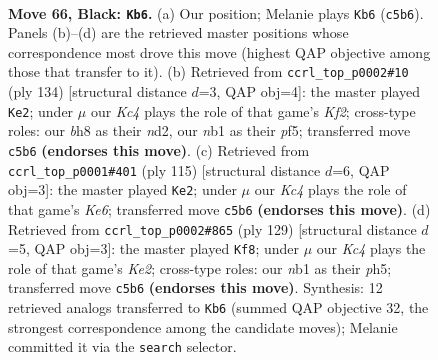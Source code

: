 \documentclass[11pt]{article}
\begin{document}
\clearpage

\begin{figure}[p]\centering
\begin{subfigure}{0.46\textwidth}\centering
\resizebox{\linewidth}{!}{%
\newchessgame
\chessboard[
  setfen={7B/8/8/p1k5/2p3b1/8/5K2/1N6 b - - 1 66},
  showmover=false,
  pgfstyle=straightmove, color=movearrow, markmove={c5-b6}
]}
\caption{}
\end{subfigure}\hfill
\begin{subfigure}{0.46\textwidth}\centering
\resizebox{\linewidth}{!}{%
\newchessgame
\chessboard[
  setfen={3B4/8/8/5p1k/8/4P3/3n1K1P/8 w - - 6 68},
  showmover=false,
  pgfstyle=straightmove, color=movearrow, markmove={f2-e2}
]}
\caption{}
\end{subfigure}
\\[4pt]
\begin{subfigure}{0.46\textwidth}\centering
\resizebox{\linewidth}{!}{%
\newchessgame
\chessboard[
  setfen={8/8/8/1P2K3/8/4k3/2Bp4/7b b - - 1 58},
  showmover=false,
  pgfstyle=straightmove, color=movearrow, markmove={e3-e2}
]}
\caption{}
\end{subfigure}\hfill
\begin{subfigure}{0.46\textwidth}\centering
\resizebox{\linewidth}{!}{%
\newchessgame
\chessboard[
  setfen={2b5/4kp2/8/7P/5K2/8/1B6/8 b - - 1 65},
  showmover=false,
  pgfstyle=straightmove, color=movearrow, markmove={e7-f8}
]}
\caption{}
\end{subfigure}
\caption{\textbf{Move 66, Black: \texttt{Kb6}.} (a) Our position; Melanie plays \texttt{Kb6} (\texttt{c5b6}). Panels (b)--(d) are the retrieved master positions whose correspondence most drove this move (highest QAP objective among those that transfer to it). (b) Retrieved from \texttt{ccrl\_top\_p0002\#10} (ply 134) [structural distance $d$=3, QAP obj=4]: the master played \texttt{Ke2}; under $\mu$ our \emph{Kc4} plays the role of that game's \emph{Kf2}; cross-type roles: our \emph{b}h8 as their \emph{n}d2, our \emph{n}b1 as their \emph{p}f5; transferred move \texttt{c5b6} \textbf{(endorses this move)}. (c) Retrieved from \texttt{ccrl\_top\_p0001\#401} (ply 115) [structural distance $d$=6, QAP obj=3]: the master played \texttt{Ke2}; under $\mu$ our \emph{Kc4} plays the role of that game's \emph{Ke6}; transferred move \texttt{c5b6} \textbf{(endorses this move)}. (d) Retrieved from \texttt{ccrl\_top\_p0002\#865} (ply 129) [structural distance $d$=5, QAP obj=3]: the master played \texttt{Kf8}; under $\mu$ our \emph{Kc4} plays the role of that game's \emph{Ke2}; cross-type roles: our \emph{n}b1 as their \emph{p}h5; transferred move \texttt{c5b6} \textbf{(endorses this move)}. Synthesis: 12 retrieved analogs transferred to \texttt{Kb6} (summed QAP objective 32, the strongest correspondence among the candidate moves); Melanie committed it via the \texttt{search} selector.}
\label{fig:thought-m131}
\end{figure}
\end{document}
